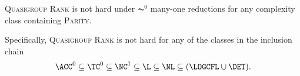 \begin{theorem}
  \textsc{Quasigroup Rank} is not hard under $\AC^0$ many-one reductions for any complexity class containing \textsc{Parity}.
\end{theorem}

Specifically, \textsc{Quasigroup Rank} is not hard for any of the classes in the inclusion chain
\begin{equation*}
  \ACC^0 \subseteq \TC^0 \subseteq \NC^1 \subseteq \L \subseteq \NL \subseteq (\LOGCFL \cup \DET).
\end{equation*}

